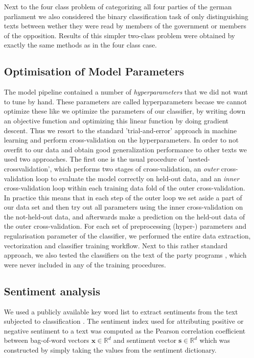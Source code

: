 \documentclass{article} %
\renewcommand{\vec}[1]{\mathbf{#1}}
\newcommand{\R}{\ensuremath{\mathds{R}}}
\begin{document}
Next to the four class problem of categorizing all four parties of the german parliament we also considered the binary classification task of only distinguishing texts between wether they were read by members of the government or members of the opposition. Results of this simpler two-class problem were obtained by exactly the same methods as in the four class case. 

\subsection{Optimisation of Model Parameters}\label{sec:crossvalidation}
The model pipeline contained a number of {\em hyperparameters} that we did not want to tune by hand. These parameters are called hyperparameters becase we cannot optimize these like we optimize the parameters of our classifier, by writing down an objective function and optimizing this linear function by doing gradient descent. Thus we resort to the standard 'trial-and-error' approach in machine learning and perform cross-validation on the hyperparameters. In order to not overfit to our data and obtain good generalization performance to other texts we used two approaches. The first one is the usual procedure of 'nested-crossvalidation', which performs two stages of cross-validation, an {\em outer} cross-validation loop to evaluate the model correctly on held-out data, and an {\em inner} cross-validation loop within each training data fold of the outer cross-validation. In practice this means that in each step of the outer loop we set aside a part of our data set and then try out all parameters using the inner cross-validation on the not-held-out data, and afterwards make a prediction on the held-out data of the outer cross-validation. For each set of preprocessing (hyper-) parameters and regularisation parameter of the classifier, we performed the entire data extraction, vectorization and classifier training workflow. Next to this rather standard approach, we also tested the classifiers on the text of the party programs \cite{linke_parteiprogramm, gruene_parteiprogramm,spd_parteiprogramm, cdu_parteiprogramm}, which were never included in any of the training procedures.

\subsection{Sentiment analysis}\label{sec:sentiment_analysis_methods}
We used a publicly available key word list to extract sentiments from the text subjected to classification \cite{remquahey2010}. The sentiment index used for attributing positive or negative sentiment to a text was computed  as the Pearson correlation coefficient between bag-of-word vectors $\vec{x}\in\R^d$ and sentiment vector $\vec{s}\in\R^d$ which was constructed by simply taking the values from the sentiment dictionary. 
\end{document}
